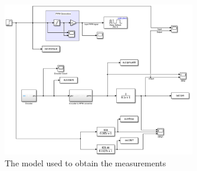\documentclass[11pt, onecolumn]{article}
\begin{document}
\begin{figure}[h!]
    \centering
    \includegraphics[width=0.75\textwidth]{q1-model.png}
    \caption{The model used to obtain the measurements}
    \label{fig:q1-model}
\end{figure}
\end{document}
